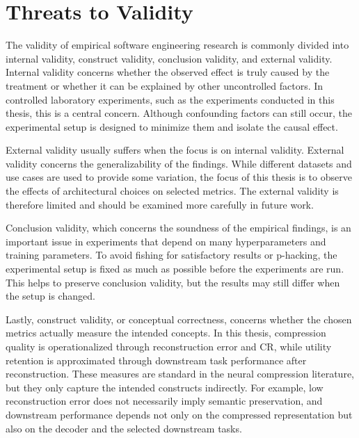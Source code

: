 \begin{table}[h]
\centering
\caption{Compression Ratio Comparison for Appliances Energy Dataset (7 channels, 144 timesteps)}
\label{tab:compression-ratios-appliances}
\end{table}

\section{Threats to Validity}

The validity of empirical software engineering research is commonly divided into internal validity, construct validity, conclusion validity, and external validity. Internal validity concerns whether the observed effect is truly caused by the treatment or whether it can be explained by other uncontrolled factors. In controlled laboratory experiments, such as the experiments conducted in this thesis, this is a central concern. Although confounding factors can still occur, the experimental setup is designed to minimize them and isolate the causal effect.

External validity usually suffers when the focus is on internal validity. External validity concerns the generalizability of the findings. While different datasets and use cases are used to provide some variation, the focus of this thesis is to observe the effects of architectural choices on selected metrics. The external validity is therefore limited and should be examined more carefully in future work.

Conclusion validity, which concerns the soundness of the empirical findings, is an important issue in experiments that depend on many hyperparameters and training parameters. To avoid fishing for satisfactory results or p-hacking, the experimental setup is fixed as much as possible before the experiments are run. This helps to preserve conclusion validity, but the results may still differ when the setup is changed.

Lastly, construct validity, or conceptual correctness, concerns whether the chosen metrics actually measure the intended concepts. In this thesis, compression quality is operationalized through reconstruction error and CR, while utility retention is approximated through downstream task performance after reconstruction. These measures are standard in the neural compression literature, but they only capture the intended constructs indirectly. For example, low reconstruction error does not necessarily imply semantic preservation, and downstream performance depends not only on the compressed representation but also on the decoder and the selected downstream tasks.
